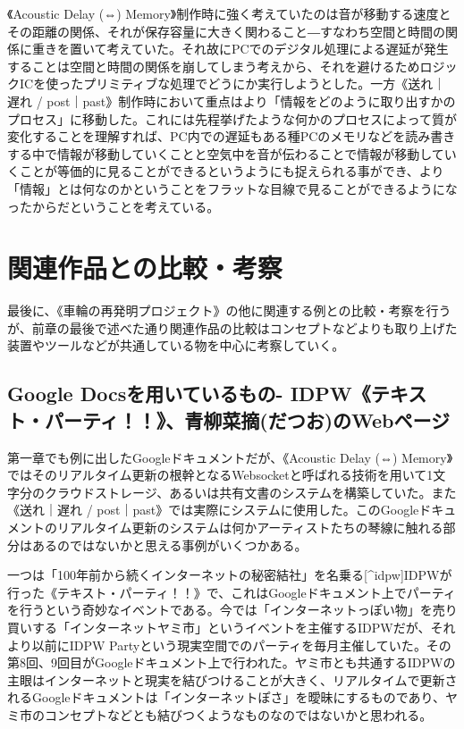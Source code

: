 \documentclass[a4paper,report]{jsbook}
\begin{document}
《Acoustic Delay (⇔)
Memory》制作時に強く考えていたのは音が移動する速度とその距離の関係、それが保存容量に大きく関わること―すなわち空間と時間の関係に重きを置いて考えていた。それ故にPCでのデジタル処理による遅延が発生することは空間と時間の関係を崩してしまう考えから、それを避けるためロジックICを使ったプリミティブな処理でどうにか実行しようとした。一方《送れ｜遅れ
/
post｜past》制作時において重点はより「情報をどのように取り出すかのプロセス」に移動した。これには先程挙げたような何かのプロセスによって質が変化することを理解すれば、PC内での遅延もある種PCのメモリなどを読み書きする中で情報が移動していくことと空気中を音が伝わることで情報が移動していくことが等価的に見ることができるというようにも捉えられる事ができ、より「情報」とは何なのかということをフラットな目線で見ることができるようになったからだということを考えている。

\section{関連作品との比較・考察}\label{ux95a2ux9023ux4f5cux54c1ux3068ux306eux6bd4ux8f03ux8003ux5bdf}

最後に、《車輪の再発明プロジェクト》の他に関連する例との比較・考察を行うが、前章の最後で述べた通り関連作品の比較はコンセプトなどよりも取り上げた装置やツールなどが共通している物を中心に考察していく。

\subsection{Google Docsを用いているもの-
IDPW《テキスト・パーティ！！》、青柳菜摘(だつお)のWebページ}\label{google-docsux3092ux7528ux3044ux3066ux3044ux308bux3082ux306e--idpwux30c6ux30adux30b9ux30c8ux30d1ux30fcux30c6ux30a3ux9752ux67f3ux83dcux6458ux3060ux3064ux304aux306ewebux30daux30fcux30b8}

第一章でも例に出したGoogleドキュメントだが、《Acoustic Delay (⇔)
Memory》ではそのリアルタイム更新の根幹となるWebsocketと呼ばれる技術を用いて1文字分のクラウドストレージ、あるいは共有文書のシステムを構築していた。また《送れ｜遅れ
/
post｜past》では実際にシステムに使用した。このGoogleドキュメントのリアルタイム更新のシステムは何かアーティストたちの琴線に触れる部分はあるのではないかと思える事例がいくつかある。

一つは「100年前から続くインターネットの秘密結社」を名乗る{[}\^{}idpw{]}IDPWが行った《テキスト・パーティ！！》で、これはGoogleドキュメント上でパーティを行うという奇妙なイベントである。今では「インターネットっぽい物」を売り買いする「インターネットヤミ市」というイベントを主催するIDPWだが、それより以前にIDPW
Partyという現実空間でのパーティを毎月主催していた\autocite{textparty1}。その第8回、9回目がGoogleドキュメント上で行われた。\autocites{textparty8}{textparty9}ヤミ市とも共通するIDPWの主眼はインターネットと現実を結びつけることが大きく、リアルタイムで更新されるGoogleドキュメントは「インターネットぽさ」を曖昧にするものであり、ヤミ市のコンセプトなどとも結びつくようなものなのではないかと思われる。
\end{document}

